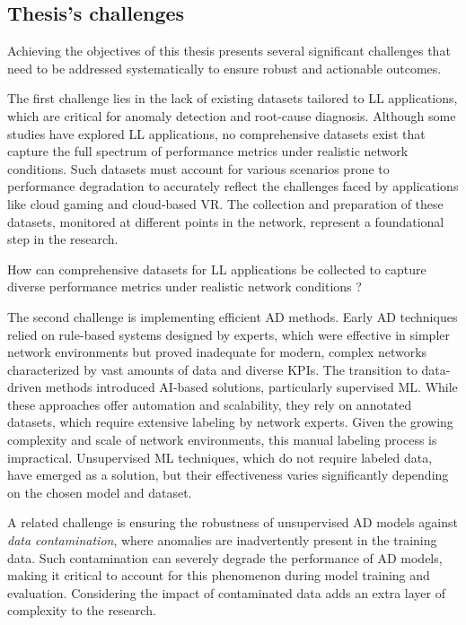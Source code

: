 \subsection*{Thesis's challenges}
Achieving the objectives of this thesis presents several significant challenges that need to be addressed systematically to ensure robust and actionable outcomes.

The first challenge lies in the lack of existing datasets tailored to \ac{LL} applications, which are critical for anomaly detection and root-cause diagnosis. Although some studies have explored \ac{LL} applications, no comprehensive datasets exist that capture the full spectrum of performance metrics under realistic network conditions. Such datasets must account for various scenarios prone to performance degradation to accurately reflect the challenges faced by applications like cloud gaming and cloud-based VR. The collection and preparation of these datasets, monitored at different points in the network, represent a foundational step in the research.

 {How can comprehensive datasets for \ac{LL} applications be collected to capture diverse performance metrics under realistic network conditions ?
}

The second challenge is implementing efficient \ac{AD} methods. Early AD techniques relied on rule-based systems designed by experts, which were effective in simpler network environments but proved inadequate for modern, complex networks characterized by vast amounts of data and diverse \ac{KPIs}. The transition to data-driven methods introduced \ac{AI}-based solutions, particularly supervised \ac{ML}. While these approaches offer automation and scalability, they rely on annotated datasets, which require extensive labeling by network experts. Given the growing complexity and scale of network environments, this manual labeling process is impractical. Unsupervised ML techniques, which do not require labeled data, have emerged as a solution, but their effectiveness varies significantly depending on the chosen model and dataset.

A related challenge is ensuring the robustness of unsupervised AD models against \textit{data contamination}, where anomalies are inadvertently present in the training data. Such contamination can severely degrade the performance of AD models, making it critical to account for this phenomenon during model training and evaluation. Considering the impact of contaminated data adds an extra layer of complexity to the research.

